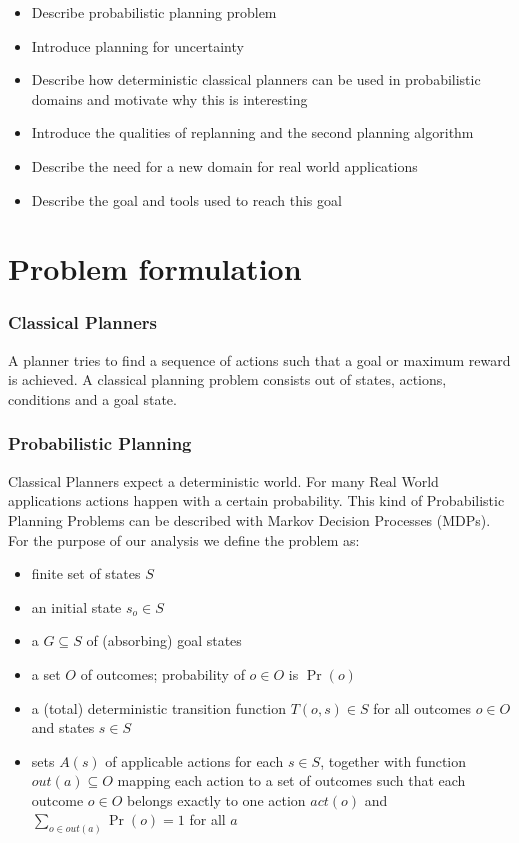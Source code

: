 \documentclass[runningheads,a4paper]{llncs}
\begin{document}
\begin{itemize}
	\item Describe probabilistic planning problem
	\item Introduce planning for uncertainty
	\item Describe how deterministic classical planners can be used in probabilistic domains and motivate why this is interesting
	\item Introduce the qualities of replanning and the second planning algorithm
	\item Describe the need for a new domain for real world applications
	\item Describe the goal and tools used to reach this goal
\end{itemize}


\section{Problem formulation}

\subsubsection{Classical Planners}

A planner tries to find a sequence of actions such that a goal or maximum
reward is achieved. A classical planning problem consists out of states,
actions, conditions and a goal state.

\subsubsection{Probabilistic Planning} Classical Planners expect a
deterministic world. For many Real World applications actions happen with a
certain probability. This kind of Probabilistic Planning Problems can be
described with Markov Decision Processes (MDPs). For the purpose of our
analysis we define the problem as:

\begin{itemize}
	\item finite set of states $S$
	\item an initial state $s_o \in S$
	\item a $G \subseteq S$ of (absorbing) goal states
	\item a set $O$ of outcomes; probability of $o \in O$ is $\Pr(o)$
	\item a (total) deterministic transition function $T(o,s) \in S$ for all
		outcomes $o \in O$ and states $s \in S$
	\item sets $A(s)$ of applicable actions for each $s \in S$, together with
		function $out(a) \subseteq O$ mapping each action to a set of outcomes
		such that each outcome $o \in O$ belongs exactly to one action $act(o)$
		and $\sum_{o \in out(a)} \Pr(o) = 1$ for all $a$
\end{itemize}
\end{document}
